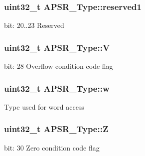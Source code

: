 \subsubsection[{\texorpdfstring{reserved1}{reserved1}}]{\setlength{\rightskip}{0pt plus 5cm}uint32\+\_\+t A\+P\+S\+R\+\_\+\+Type\+::reserved1}\hypertarget{unionAPSR__Type_a268939f602ca41cb4f1f71d7f0eae806}{}\label{unionAPSR__Type_a268939f602ca41cb4f1f71d7f0eae806}
bit\+: 20..23 Reserved 
\subsubsection[{\texorpdfstring{V}{V}}]{\setlength{\rightskip}{0pt plus 5cm}uint32\+\_\+t A\+P\+S\+R\+\_\+\+Type\+::V}\hypertarget{unionAPSR__Type_a8004d224aacb78ca37774c35f9156e7e}{}\label{unionAPSR__Type_a8004d224aacb78ca37774c35f9156e7e}
bit\+: 28 Overflow condition code flag 
\subsubsection[{\texorpdfstring{w}{w}}]{\setlength{\rightskip}{0pt plus 5cm}uint32\+\_\+t A\+P\+S\+R\+\_\+\+Type\+::w}\hypertarget{unionAPSR__Type_ae4c2ef8c9430d7b7bef5cbfbbaed3a94}{}\label{unionAPSR__Type_ae4c2ef8c9430d7b7bef5cbfbbaed3a94}
Type used for word access 
\subsubsection[{\texorpdfstring{Z}{Z}}]{\setlength{\rightskip}{0pt plus 5cm}uint32\+\_\+t A\+P\+S\+R\+\_\+\+Type\+::Z}\hypertarget{unionAPSR__Type_a3b04d58738b66a28ff13f23d8b0ba7e5}{}\label{unionAPSR__Type_a3b04d58738b66a28ff13f23d8b0ba7e5}
bit\+: 30 Zero condition code flag 

